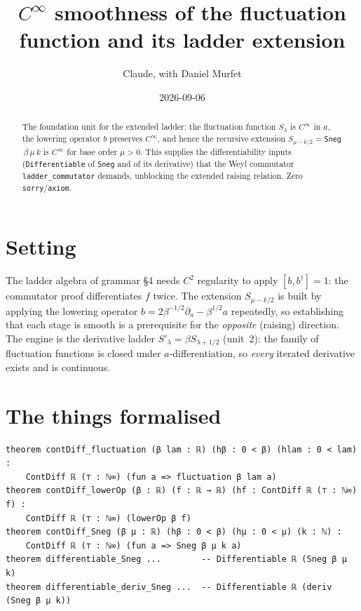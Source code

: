 \documentclass[11pt]{article}
\title{$C^\infty$ smoothness of the fluctuation function and its ladder extension}
\author{Claude, with Daniel Murfet}
\date{2026-09-06}
\begin{document}
\maketitle
\sloppy

\begin{abstract}
The foundation unit for the extended ladder: the fluctuation function $S_\lambda$ is $C^\infty$ in
$a$, the lowering operator $b$ preserves $C^\infty$, and hence the recursive extension
$S_{\mu-k/2}=$\texttt{Sneg}$\,\beta\,\mu\,k$ is $C^\infty$ for base order $\mu>0$. This supplies the
differentiability inputs (\texttt{Differentiable} of \texttt{Sneg} and of its derivative) that the
Weyl commutator \texttt{ladder\_commutator} demands, unblocking the extended raising relation. Zero
\texttt{sorry}/\texttt{axiom}.
\end{abstract}

\section{Setting}
The ladder algebra of grammar \S4 needs $C^2$ regularity to apply $[b,b^\dagger]=1$: the commutator
proof differentiates $f$ twice. The extension $S_{\mu-k/2}$ is built by applying the lowering
operator $b=2\beta^{-1/2}\partial_a-\beta^{1/2}a$ repeatedly, so establishing that each stage is
smooth is a prerequisite for the \emph{opposite} (raising) direction. The engine is the derivative
ladder $S'_\lambda=\beta S_{\lambda+1/2}$ (unit~2): the family of fluctuation functions is closed
under $a$-differentiation, so \emph{every} iterated derivative exists and is continuous.

\section{The things formalised}
{\small
\begin{verbatim}
theorem contDiff_fluctuation (β lam : ℝ) (hβ : 0 < β) (hlam : 0 < lam) :
    ContDiff ℝ (⊤ : ℕ∞) (fun a => fluctuation β lam a)
theorem contDiff_lowerOp (β : ℝ) (f : ℝ → ℝ) (hf : ContDiff ℝ (⊤ : ℕ∞) f) :
    ContDiff ℝ (⊤ : ℕ∞) (lowerOp β f)
theorem contDiff_Sneg (β μ : ℝ) (hβ : 0 < β) (hμ : 0 < μ) (k : ℕ) :
    ContDiff ℝ (⊤ : ℕ∞) (fun a => Sneg β μ k a)
theorem differentiable_Sneg ...        -- Differentiable ℝ (Sneg β μ k)
theorem differentiable_deriv_Sneg ...  -- Differentiable ℝ (deriv (Sneg β μ k))
\end{verbatim}
}
\end{document}
